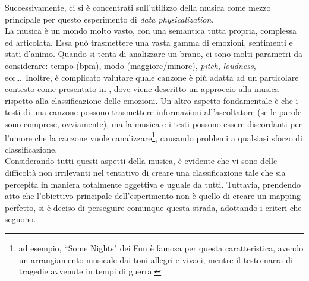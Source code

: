 \documentclass[12pt,a4paper]{report}
\begin{document}
Successivamente, ci si è concentrati sull'utilizzo della musica come mezzo principale per questo esperimento di \textit{data physicalization}.\\

La musica è un mondo molto vasto, con una semantica tutta propria, complessa ed articolata. Essa può trasmettere una vasta gamma di emozioni, sentimenti e stati d'animo. Quando si tenta di analizzare un brano, ci sono molti parametri da considerare: tempo (bpm), modo (maggiore/minore), \textit{pitch}, \textit{loudness}, ecc\dots\ Inoltre, è complicato valutare quale canzone è più adatta ad un particolare contesto come presentato in \cite{han2010music}, dove viene descritto un approccio alla musica rispetto alla classificazione delle emozioni.
Un altro aspetto fondamentale è che i testi di una canzone possono trasmettere informazioni all'ascoltatore (se le parole sono comprese, ovviamente), ma la musica e i testi possono essere discordanti per l'umore che la canzone vuole canalizzare\footnote{ad esempio, ``Some Nights" dei Fun è famosa per questa caratteristica, avendo un arrangiamento musicale dai toni allegri e vivaci, mentre il testo narra di tragedie avvenute in tempi di guerra.}, %
causando problemi a qualsiasi sforzo di classificazione.\\

Considerando tutti questi aspetti della musica, è evidente che vi sono delle difficoltà non irrilevanti nel tentativo di creare una classificazione tale che sia percepita in maniera totalmente oggettiva e uguale da tutti. Tuttavia, prendendo atto che l'obiettivo principale dell'esperimento non è quello di creare un mapping perfetto, si è deciso di perseguire comunque questa strada, adottando i criteri che seguono.\\
\end{document}

